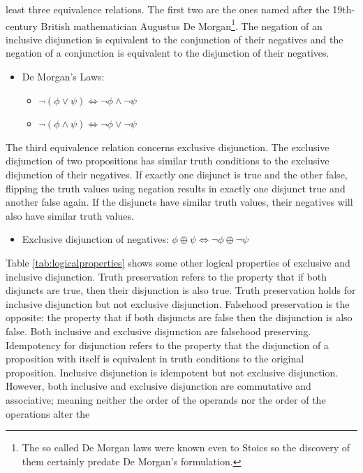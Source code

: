 \documentclass[oneside]{report}
\theoremstyle{definition}
\theoremstyle{definition}
\theoremstyle{definition}
\theoremstyle{remark}
\begin{document}
least three equivalence relations. The first two are the ones named
after the 19th-century British mathematician Augustus De
Morgan\footnote{The so called De Morgan laws were known even to Stoics
  so the discovery of them certainly predate De Morgan's formulation.}.
The negation of an inclusive disjunction is equivalent to the
conjunction of their negatives and the negation of a conjunction is
equivalent to the disjunction of their negatives.
\begin{itemize}
\tightlist
\item
  De Morgan's Laws:
  \begin{itemize}
  \tightlist
  \item
    \(\lnot (\phi \lor \psi) \Leftrightarrow \lnot \phi \land \lnot \psi\)
  \item
    \(\lnot (\phi \land \psi) \Leftrightarrow \lnot \phi \lor \lnot \psi\)
  \end{itemize}
\end{itemize}
The third equivalence relation concerns exclusive disjunction. The
exclusive disjunction of two propositions has similar truth conditions
to the exclusive disjunction of their negatives. If exactly one disjunct
is true and the other false, flipping the truth values using negation
results in exactly one disjunct true and another false again. If the
disjuncts have similar truth values, their negatives will also have
similar truth values.
\begin{itemize}
\tightlist
\item
  Exclusive disjunction of negatives:
  \(\phi \oplus \psi \Leftrightarrow \lnot \phi \oplus \lnot \psi\)
\end{itemize}
Table \ref{tab:logicalproperties} shows some other logical properties of
exclusive and inclusive disjunction. Truth preservation refers to the
property that if both disjuncts are true, then their disjunction is also
true. Truth preservation holds for inclusive disjunction but not
exclusive disjunction. Falsehood preservation is the opposite: the
property that if both disjuncts are false then the disjunction is also
false. Both inclusive and exclusive disjunction are falsehood
preserving. Idempotency for disjunction refers to the property that the
disjunction of a proposition with itself is equivalent in truth
conditions to the original proposition. Inclusive disjunction is
idempotent but not exclusive disjunction. However, both inclusive and
exclusive disjunction are commutative and associative; meaning neither
the order of the operands nor the order of the operations alter the
\end{document}
